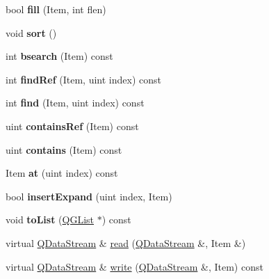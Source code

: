 \begin{DoxyCompactItemize}
\item 
\mbox{\label{class_q_g_vector_a00faa8dfe03f9148b87086def2c75f5d}} 
bool {\bfseries fill} (Item, int flen)
\item 
\mbox{\label{class_q_g_vector_ab43b21e4cb61c798ea3fbfbd11cab659}} 
void {\bfseries sort} ()
\item 
\mbox{\label{class_q_g_vector_a402afaa88784fb5b03ffd0b50af6799e}} 
int {\bfseries bsearch} (Item) const
\item 
\mbox{\label{class_q_g_vector_a5880d2fd6502616bee706e035c5f7395}} 
int {\bfseries find\+Ref} (Item, uint index) const
\item 
\mbox{\label{class_q_g_vector_a0115ca3b2cd76905e5d5896ae037f164}} 
int {\bfseries find} (Item, uint index) const
\item 
\mbox{\label{class_q_g_vector_a41c23424203379d69bb1a88ee864e4c2}} 
uint {\bfseries contains\+Ref} (Item) const
\item 
\mbox{\label{class_q_g_vector_a763d499783b36d6951f47fb185164b22}} 
uint {\bfseries contains} (Item) const
\item 
\mbox{\label{class_q_g_vector_a939a986752dff4e679961354e2d798fe}} 
Item {\bfseries at} (uint index) const
\item 
\mbox{\label{class_q_g_vector_a241de736b4e5073454342d9dbf060fdb}} 
bool {\bfseries insert\+Expand} (uint index, Item)
\item 
\mbox{\label{class_q_g_vector_a3dd5cc73b1f0756d0c28791632b23590}} 
void {\bfseries to\+List} (\mbox{\hyperlink{class_q_g_list}{Q\+G\+List}} $\ast$) const
\item 
virtual \mbox{\hyperlink{class_q_data_stream}{Q\+Data\+Stream}} \& \mbox{\hyperlink{class_q_g_vector_a6ffba6b62053655e2d5aec0138a2e128}{read}} (\mbox{\hyperlink{class_q_data_stream}{Q\+Data\+Stream}} \&, Item \&)
\item 
virtual \mbox{\hyperlink{class_q_data_stream}{Q\+Data\+Stream}} \& \mbox{\hyperlink{class_q_g_vector_a0cdc8ad2beacd1077fd68f03ed8492e8}{write}} (\mbox{\hyperlink{class_q_data_stream}{Q\+Data\+Stream}} \&, Item) const
\end{DoxyCompactItemize}
